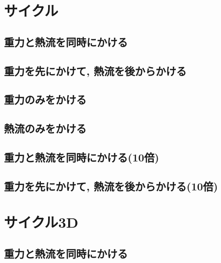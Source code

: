 


\section{サイクル}

\subsection{重力と熱流を同時にかける}



\subsection{重力を先にかけて, 熱流を後からかける}



\subsection{重力のみをかける}



\subsection{熱流のみをかける}



\subsection{重力と熱流を同時にかける(10倍)}



\subsection{重力を先にかけて, 熱流を後からかける(10倍)}




\section{サイクル3D}

\subsection{重力と熱流を同時にかける}

